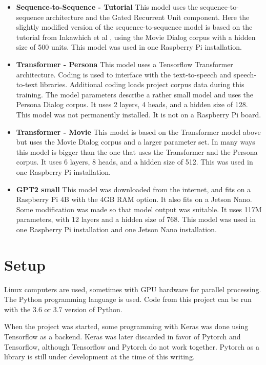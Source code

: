 \begin{itemize}
	\item \textbf{Sequence-to-Sequence - Tutorial} This model uses the sequence-to-sequence architecture and the Gated Recurrent Unit component. Here the slightly modified version of the sequence-to-sequence model is based on the tutorial from Inkawhich et al \cite{2018Inkawhich}, using the Movie Dialog corpus with a hidden size of 500 units. This model was used in one Raspberry Pi installation.
	
	\item \textbf{Transformer - Persona} This model uses a Tensorflow Transformer architecture. Coding is used to interface with the text-to-speech and speech-to-text libraries. Additional coding loads project corpus data during this training. The model parameters describe a rather small model and uses the Persona Dialog corpus. It uses 2 layers, 4  heads, and a hidden size of 128. This model was not permanently installed. It is not on a Raspberry Pi board.
	
	\item \textbf{Transformer - Movie} This model is based on the Transformer model above but uses the Movie Dialog corpus and a larger parameter set. In many ways this model is bigger than the one that uses the Transformer and the Persona corpus. It uses 6 layers, 8 heads, and a hidden size of 512. This was used in one Raspberry Pi installation.
	
	\item \textbf{GPT2 small} This model was downloaded from the internet, and fits on a Raspberry Pi 4B with the 4GB RAM option. It also fits on a Jetson Nano. Some modification was made so that model output was suitable. It uses 117M parameters, with 12 layers and a hidden size of 768. This model was used in one Raspberry Pi installation and one Jetson Nano installation.
\end{itemize}

\section{Setup}

Linux computers are used, sometimes with \ac{GPU} hardware for parallel processing. The Python programming language is used. Code from this project can be run with the 3.6 or 3.7 version of Python.

When the project was started, some programming with Keras was done using Tensorflow as a backend. Keras was later discarded in favor of Pytorch and Tensorflow, although Tensorflow and Pytorch do not work together. Pytorch as a library is still under development at the time of this writing.


